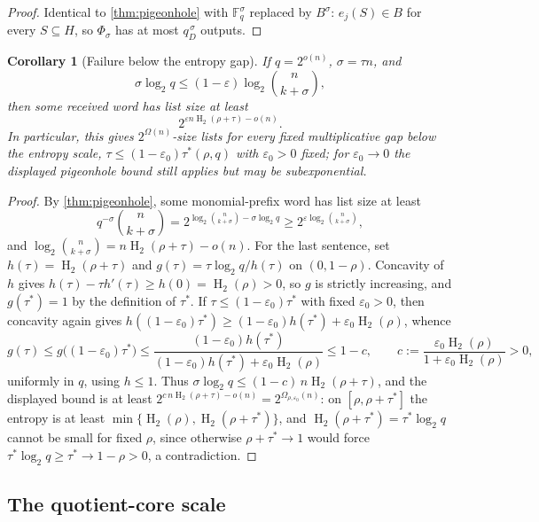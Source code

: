 \documentclass[11pt]{article}
\newtheorem{corollary}[corollary]{Corollary}
\theoremstyle{definition}
\newcommand{\F}{\mathbb F}
\newcommand{\eps}{\varepsilon}
\newcommand{\HH}{\operatorname{H}_2}
\newcommand{\taustar}{\tau^{*}}
\begin{document}
\begin{proof}
Identical to \cref{thm:pigeonhole} with $\F_q^\sigma$ replaced by $B^\sigma$: $e_j(S)\in B$ for every $S\subseteq H$, so $\Phi_\sigma$ has at most $q_D^{\,\sigma}$ outputs.
\end{proof}

\begin{corollary}[Failure below the entropy gap]\label{cor:entropy-lower}
If $q=2^{o(n)}$, $\sigma=\tau n$, and
\[
        \sigma\log_2q\le (1-\eps)\log_2\binom n{k+\sigma},
\]
then some received word has list size at least
\[
        2^{\eps n\HH(\rho+\tau)-o(n)}.
\]
In particular, this gives $2^{\Omega(n)}$-size lists for every fixed multiplicative gap below the entropy scale, $\tau\le(1-\eps_0)\taustar(\rho,q)$ with $\eps_0>0$ fixed; for $\eps_0\to0$ the displayed pigeonhole bound still applies but may be subexponential.
\end{corollary}

\begin{proof}
By \cref{thm:pigeonhole}, some monomial-prefix word has list size at least
\[
        q^{-\sigma}\binom n{k+\sigma}
        =2^{\log_2\binom n{k+\sigma}-\sigma\log_2q}
        \ge2^{\eps\log_2\binom n{k+\sigma}},
\]
and $\log_2\binom n{k+\sigma}=n\HH(\rho+\tau)-o(n)$.  For the last sentence, set $h(\tau)=\HH(\rho+\tau)$ and $g(\tau)=\tau\log_2q/h(\tau)$ on $(0,1-\rho)$.  Concavity of $h$ gives $h(\tau)-\tau h'(\tau)\ge h(0)=\HH(\rho)>0$, so $g$ is strictly increasing, and $g(\taustar)=1$ by the definition of $\taustar$.  If $\tau\le(1-\eps_0)\taustar$ with fixed $\eps_0>0$, then concavity again gives $h((1-\eps_0)\taustar)\ge(1-\eps_0)h(\taustar)+\eps_0\HH(\rho)$, whence
\[
        g(\tau)\le g\big((1-\eps_0)\taustar\big)
        \le\frac{(1-\eps_0)h(\taustar)}{(1-\eps_0)h(\taustar)+\eps_0\HH(\rho)}
        \le 1-c,
        \qquad
        c:=\frac{\eps_0\HH(\rho)}{1+\eps_0\HH(\rho)}>0,
\]
uniformly in $q$, using $h\le1$.  Thus $\sigma\log_2q\le(1-c)\,n\HH(\rho+\tau)$, and the displayed bound is at least $2^{c\,n\HH(\rho+\tau)-o(n)}=2^{\Omega_{\rho,\eps_0}(n)}$: on $[\rho,\rho+\taustar]$ the entropy is at least $\min\{\HH(\rho),\HH(\rho+\taustar)\}$, and $\HH(\rho+\taustar)=\taustar\log_2q$ cannot be small for fixed $\rho$, since otherwise $\rho+\taustar\to1$ would force $\taustar\log_2q\ge\taustar\to1-\rho>0$, a contradiction.
\end{proof}

\subsection{The quotient-core scale}\label{subsec:qcore}
\end{document}
